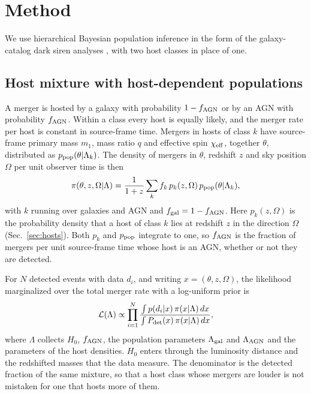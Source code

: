 \documentclass[aps,prd,reprint,twocolumn,superscriptaddress,nofootinbib,floatfix]{revtex4-2}
\newcommand{\Lcal}{\mathcal{L}}
\newcommand{\chieff}{\chi_{\rm eff}}
\newcommand{\fagn}{f_{\rm AGN}}
\begin{document}
\section{Method}
\label{sec:method}

We use hierarchical Bayesian population inference
\cite{Loredo:2004nn,Mandel:2018mve,Thrane:2018qnx,Vitale:2020aaz} in the form
of the galaxy-catalog dark siren analyses
\cite{Gray:2019ksv,Gair:2022zsa,Mastrogiovanni:2023emh,Gray:2023wgj}, with
two host classes in place of one.

\subsection{Host mixture with host-dependent populations}
\label{sec:mixture}

A merger is hosted by a galaxy with probability $1-\fagn$ or by an AGN with
probability $\fagn$. Within a class every host is equally likely, and the
merger rate per host is constant in source-frame time. Mergers in hosts of
class $k$ have source-frame primary mass $m_1$, mass ratio $q$ and effective
spin $\chieff$, together $\theta$, distributed as $p_{\rm
pop}(\theta|\Lambda_k)$. The density of mergers in $\theta$, redshift $z$ and
sky position $\Omega$ per unit observer time is then
\begin{equation}
\pi(\theta,z,\Omega|\Lambda)=\frac{1}{1+z}\sum_{k}f_k\,p_k(z,\Omega)\,
p_{\rm pop}(\theta|\Lambda_k) ,
\label{eq:mixture}
\end{equation}
with $k$ running over galaxies and AGN and $f_{\rm gal}=1-\fagn$. Here $p_k(z,\Omega)$ is the probability density that a host of
class $k$ lies at redshift $z$ in the direction $\Omega$
(Sec.~\ref{sec:hosts}). Both $p_k$ and $p_{\rm pop}$ integrate to one, so
$\fagn$ is the fraction of mergers per unit source-frame time whose host is
an AGN, whether or not they are detected.

For $N$ detected events with data $d_i$, and writing $x=(\theta,z,\Omega)$,
the likelihood marginalized over the total merger rate with a log-uniform
prior is \cite{Mandel:2018mve}
\begin{equation}
\Lcal(\Lambda)\propto\prod_{i=1}^{N}
\frac{\int p(d_i|x)\,\pi(x|\Lambda)\,dx}
{\int P_{\rm det}(x)\,\pi(x|\Lambda)\,dx} ,
\label{eq:like}
\end{equation}
where $\Lambda$ collects $H_0$, $\fagn$, the population parameters
$\Lambda_{\rm gal}$ and $\Lambda_{\rm AGN}$ and the parameters of the host
densities. $H_0$ enters through the luminosity distance and the redshifted
masses that the data measure. The denominator is the detected fraction of the
same mixture, so that a host class whose mergers are louder is not mistaken
for one that hosts more of them.
\end{document}
